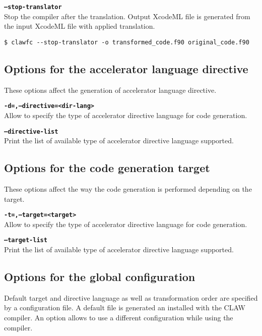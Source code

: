 \documentclass{article}
\begin{document}
\textbf{\texttt{--stop-translator}}\\
Stop the compiler after the translation. Output XcodeML file is generated from the input XcodeML file with applied translation.
\begin{lstlisting}
$ clawfc --stop-translator -o transformed_code.f90 original_code.f90
\end{lstlisting}

\subsection{Options for the accelerator language directive}
These options affect the generation of accelerator language directive.

\textbf{\texttt{-d=,--directive=<dir-lang>}}\\
Allow to specify the type of accelerator directive language for code generation.

\textbf{\texttt{--directive-list}}\\
Print the list of available type of accelerator directive language supported.

\subsection{Options for the code generation target}
These options affect the way the code generation is performed depending on the target.

\textbf{\texttt{-t=,--target=<target>}}\\
Allow to specify the type of accelerator directive language for code generation.

\textbf{\texttt{--target-list}}\\
Print the list of available type of accelerator directive language supported.

\subsection{Options for the global configuration}
Default target and directive language as well as transformation order are specified
by a configuration file.
A default file is generated an installed with the CLAW compiler. An option allows to
use a different configuration while using the compiler.
\end{document}

